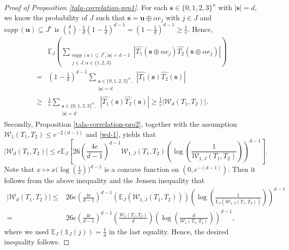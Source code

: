 \documentclass{amsbook}
\theoremstyle{definition}
\theoremstyle{remark}
\numberwithin{section}{chapter}
\numberwithin{equation}{chapter}
\newcommand{\1}{\mathbf{1}}
\newcommand{\s}{\mathbf{s}}
\newcommand{\E}{\mathbb{E}}
\newcommand{\supp}{{\mathrm supp}\,}
\begin{document}
\begin{proof}[Proof of Proposition \ref{tala-correlation-pro1}]
For each $\s\in \{0,1,2,3\}^{n}$ with $|\s|=d$, we know the probability of $J$ such that $\s=\mathbf{u}\oplus \alpha e_{j}$ with $j\in J$ and $\supp(\mathbf{u})\subseteq J^{c}$ is $\binom{d}{1}\cdot\frac{1}{d}(1-\frac{1}{d})^{d-1}=(1-\frac{1}{d})^{d-1}\geq \frac{1}{e}$. Hence, 
\begin{equation}\label{wd-1}
\begin{aligned}
&\E_{J}\left(\sum_{\substack{\supp(\s)\subseteq J^{c}, |\s|=d-1\\j\in J,\alpha \in\{1,2,3\}}}\left|\widehat{T_1}\left(\s\oplus \alpha e_j\right)\widehat{T_2}\left(\s\oplus \alpha e_j\right)\right|\right)\\
=&\left(1-\frac{1}{d}\right)^{d-1}\sum_{\substack{\s\in\{0,1,2,3\}^{n},\\|\s|=d}}\left|\widehat{T_1}(\s )\widehat{T_2}(\s)\right|\\
\geq&\frac{1}{e}\sum_{\substack{\s\in\{0,1,2,3\}^{n},\\|\s|=d}}\left|\widehat{T_1}(\s)\widehat{T_2}(\s)\right|\geq \frac{1}{e}|\mathcal{W}_{d}(T_1,T_2)|.
\end{aligned}
\end{equation}
Secondly, Proposition \ref{tala-correlation-pro2}, together with the assumption $\mathcal{W}_1(T_1,T_2)\leq e^{-2(d-1)}$ and \eqref{wd-1}, yields that
  $$|\mathcal{W}_{d}(T_1,T_2)|\leq e\mathbb{E}_{J}\left[26\left(\frac{4e}{d-1}\right)^{d-1}\mathcal{W}_{1,J}(T_1,T_2)\left(\log\left(\frac{1}{\mathcal{W}_{1,J}(T_1,T_2)}\right)\right)^{d-1}\right].$$
Note that $x\mapsto x\big(\log(\frac{1}{x})\big)^{d-1}$ is a concave function on $(0,e^{-(d-1)})$. Then it follows from the above inequality and the Jensen inequality that
\begin{equation*}\label{wd-2}
\begin{aligned}
|\mathcal{W}_{d}(T_1,T_2)|\leq&26e\left(\frac{4e}{d-1}\right)^{d-1}\left(\mathbb{E}_{J}\left(\mathcal{W}_{1,J}(T_1,T_2)\right)\right)\left(\log\left(\frac{1}{\mathbb{E}_{J}(\mathcal{W}_{1,J}(T_1,T_2))}\right)\right)^{d-1}\\
=&26e\left(\frac{4e}{d-1}\right)^{d-1}\left(\frac{\mathcal{W}_1\left(T_1,T_2\right)}{d}\right)\left(\log\left(\frac{d}{\mathcal{W}_1\left(T_1,T_2\right)}\right)\right)^{d-1},
\end{aligned}
\end{equation*}
where we used $\mathbb{E}_{J}(\mathds{1}_{J}(j))=\frac{1}{d}$ in the last equality. Hence,  the desired inequality follows. 
\end{proof}
\end{document}
